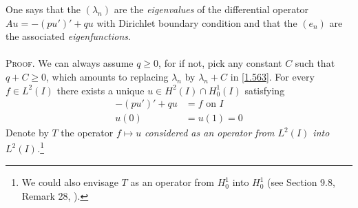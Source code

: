 \documentclass[a4paper,oneside]{book}
\numberwithin{equation}{chapter}
\begin{document}
One says that the $\left(\lambda _n\right)$ are the \textit{eigenvalues} of the differential operator $Au=-\left(pu'\right)'+qu$ with Dirichlet boundary condition and that the $\left(e_n\right)$ are the associated \textit{eigenfunctions}.\\
\\
\textsc{Proof.} We can always assume $q\ge 0$, for if not, pick any constant $C$ such that $q+C\ge 0$, which amounts to replacing $\lambda _n$ by $\lambda _n+C$ in \eqref{1.563}. For every $f\in L^2\left(I\right)$ there exists a unique $u \in {H^2}\left( I \right) \cap H_0^1\left( I \right)$ satisfying
\begin{align}
\label{1.565}
 - \left( {pu'} \right)' + qu &= f\mbox{ on } I\\
u\left( 0 \right) &= u\left( 1 \right) = 0 \label{1.566}
\end{align}
Denote by $T$ the operator $f\mapsto u$ \textit{considered as an operator from $L^2\left(I\right)$ into $L^2\left(I\right)$.}\footnote{We could also envisage $T$ as an operator from $H_0^1$ into $H_0^1$ (see Section 9.8, Remark 28, \cite{1}).}
\end{document}
